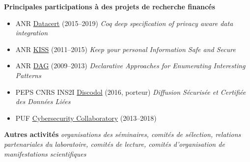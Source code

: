\documentclass[12pt,a4paper]{article}
\newcommand{\activite}[1]{\textbf{#1}\xspace}
\newcommand{\comment}[1]{\textsl{#1}\xspace}
\begin{document}
\activite{Principales participations à des projets de recherche financés}  
\begin{itemize}
  \item ANR \href{http://datacert.lri.fr/}{Datacert} (2015--2019) \emph{Coq deep specification of privacy aware data integration} %
  \item ANR \href{https://project.inria.fr/smis/anr-kiss-dec-2011-dec-2015/}{KISS} (2011--2015) \emph{Keep your personal Information Safe and Secure} %
  \item ANR \href{https://projet.liris.cnrs.fr/dag/}{DAG} (2009--2013) \emph{Declarative Approaches for Enumerating Interesting Patterns}
  \item PEPS CNRS INS2I \href{http://archives.cnrs.fr/ins2i/?r=discodol}{Discodol} (2016, porteur) \emph{Diffusion Sécurisée et Certifiée des Données Liées} %
    \item PUF \href{https://projet.liris.cnrs.fr/cyber/}{Cybersecurity Collaboratory} (2013--2018)
\end{itemize}

\activite{Autres activités} \comment{organisations des séminaires, comités de sélection, relations partenariales du laboratoire, comités de lecture, comités d'organisation de manifestations scientifiques}
\end{document}
